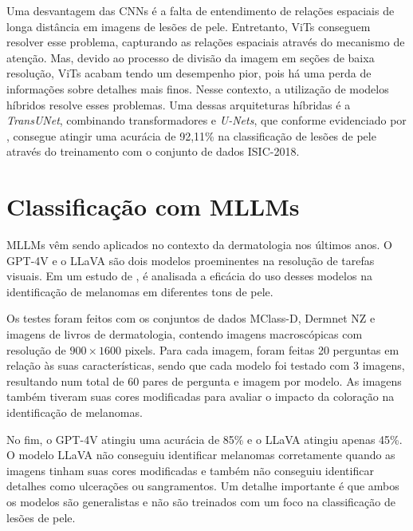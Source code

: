 Uma desvantagem das \acp{CNN} é a falta de entendimento de relações espaciais de longa distância em imagens de lesões de pele. Entretanto, \acp{ViT} conseguem resolver
esse problema, capturando as relações espaciais através do mecanismo de atenção. Mas, devido ao processo de divisão da imagem em seções de baixa resolução, \acp{ViT}
acabam tendo um desempenho pior, pois há uma perda de informações sobre detalhes mais finos. Nesse contexto, a utilização de modelos híbridos resolve esses problemas.
Uma dessas arquiteturas híbridas é a \textit{TransUNet}, combinando transformadores e \textit{U-Nets}, que conforme evidenciado por \textcite{gulzar2022skin}, consegue
atingir uma acurácia de 92,11\% na classificação de lesões de pele através do treinamento com o conjunto de dados \ac{ISIC}-2018.

\section{Classificação com MLLMs}

\acp{MLLM} vêm sendo aplicados no contexto da dermatologia nos últimos anos. O \ac{GPT}-4V e o \ac{LLaVA} são dois modelos proeminentes na resolução de tarefas
visuais. Em um estudo de \textcite{cirone2024assessing}, é analisada a eficácia do uso desses modelos na identificação de melanomas em diferentes tons de pele.

Os testes foram feitos com os conjuntos de dados MClass-D, Dermnet NZ e imagens de livros de dermatologia, contendo imagens macroscópicas com resolução de
\begin{math}900 \times 1600\end{math} pixels. Para cada imagem, foram feitas 20 perguntas em relação às suas características, sendo que cada modelo foi testado com 3
imagens, resultando num total de 60 pares de pergunta e imagem por modelo. As imagens também tiveram suas cores modificadas para avaliar o impacto da coloração na
identificação de melanomas.


No fim, o \ac{GPT}-4V atingiu uma acurácia de 85\% e o \ac{LLaVA} atingiu apenas 45\%. O modelo \ac{LLaVA} não conseguiu identificar melanomas corretamente quando as
imagens tinham suas cores modificadas e também não conseguiu identificar detalhes como ulcerações ou sangramentos. Um detalhe importante é que ambos os modelos são
generalistas e não são treinados com um foco na classificação de lesões de pele.


